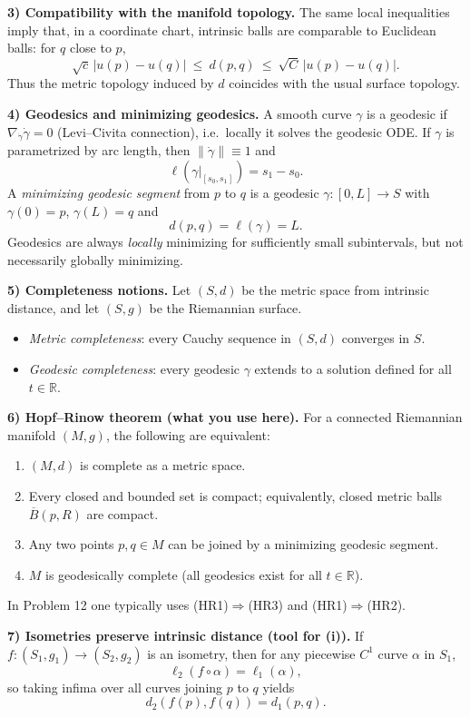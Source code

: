 \documentclass[12pt,a4paper]{article}
\theoremstyle{plain}
\theoremstyle{definition}      %
\begin{document}
	\smallskip
	\textbf{3) Compatibility with the manifold topology.}
	The same local inequalities imply that, in a coordinate chart, intrinsic balls are comparable to Euclidean balls:
	for $q$ close to $p$,
	\[
	\sqrt{c}\,|u(p)-u(q)| \ \le\ d(p,q)\ \le\ \sqrt{C}\,|u(p)-u(q)|.
	\]
	Thus the metric topology induced by $d$ coincides with the usual surface topology.
	
	\smallskip
	\textbf{4) Geodesics and minimizing geodesics.}
	A smooth curve $\gamma$ is a geodesic if $\nabla_{\dot\gamma}\dot\gamma=0$ (Levi--Civita connection), i.e.\ locally it solves
	the geodesic ODE. If $\gamma$ is parametrized by arc length, then $\|\dot\gamma\|\equiv 1$ and
	\[
	\ell(\gamma|_{[s_0,s_1]})=s_1-s_0.
	\]
	A \emph{minimizing geodesic segment} from $p$ to $q$ is a geodesic $\gamma:[0,L]\to S$ with $\gamma(0)=p$, $\gamma(L)=q$ and
	\[
	d(p,q)=\ell(\gamma)=L.
	\]
	Geodesics are always \emph{locally} minimizing for sufficiently small subintervals, but not necessarily globally minimizing.
	
	\smallskip
	\textbf{5) Completeness notions.}
	Let $(S,d)$ be the metric space from intrinsic distance, and let $(S,g)$ be the Riemannian surface.
	\begin{itemize}
		\item \emph{Metric completeness}: every Cauchy sequence in $(S,d)$ converges in $S$.
		\item \emph{Geodesic completeness}: every geodesic $\gamma$ extends to a solution defined for all $t\in\mathbb R$.
	\end{itemize}
	
	\smallskip
	\textbf{6) Hopf--Rinow theorem (what you use here).}
	For a connected Riemannian manifold $(M,g)$, the following are equivalent:
	\begin{enumerate}
		\item[(HR1)] $(M,d)$ is complete as a metric space.
		\item[(HR2)] Every closed and bounded set is compact; equivalently, closed metric balls $\overline{B}(p,R)$ are compact.
		\item[(HR3)] Any two points $p,q\in M$ can be joined by a minimizing geodesic segment.
		\item[(HR4)] $M$ is geodesically complete (all geodesics exist for all $t\in\mathbb R$).
	\end{enumerate}
	In Problem 12 one typically uses (HR1)$\Rightarrow$(HR3) and (HR1)$\Rightarrow$(HR2).
	
	\smallskip
	\textbf{7) Isometries preserve intrinsic distance (tool for (i)).}
	If $f:(S_1,g_1)\to(S_2,g_2)$ is an isometry, then for any piecewise $C^1$ curve $\alpha$ in $S_1$,
	\[
	\ell_{2}(f\circ\alpha)=\ell_{1}(\alpha),
	\]
	so taking infima over all curves joining $p$ to $q$ yields
	\[
	d_2(f(p),f(q))=d_1(p,q).
	\]
	
\end{document}
